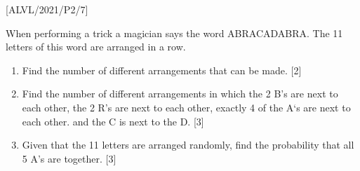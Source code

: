 \item {[}ALVL/2021/P2/7{]}

When performing a trick a magician says the word ABRACADABRA. The
11 letters of this word are arranged in a row. 
\begin{enumerate}
\item Find the number of different arrangements that can be made. \hfill{}
{[}2{]}
\item Find the number of different arrangements in which the 2 B's are next
to each other, the 2 R's are next to each other, exactly 4 of the
A\textquoteleft s are next to each other. and the C is next to the
D. \hfill{}{[}3{]}
\item Given that the 11 letters are arranged randomly, find the probability
that all 5 A's are together. \hfill{} {[}3{]}
\end{enumerate}
